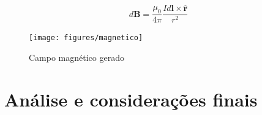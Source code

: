 \documentclass[
	article,			%
	11pt,				%
	oneside,			%
	a4paper,			%
	english,			%
	brazil,				%
	sumario=tradicional
	]{abntex2}
\begin{document}
\begin{equation} \label{eq:biot-savart}
	d\textbf{B} = \frac{\mu_0}{4\pi} \frac{Id\textbf{l} \times \hat{\textbf{r}}}{r^2}
\end{equation}

\begin{figure}[h]
	\centering
	\texttt{[image: figures/magnetico]}
	\caption[Campo magnético gerado]{Campo magnético gerado}
	\label{fig:magnetico}
\end{figure}


\section{Análise e considerações finais}




\end{document}
